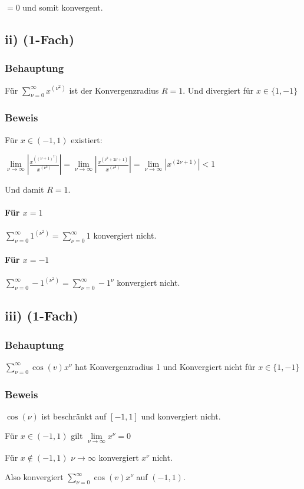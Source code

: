 $ = 0$ und somit konvergent.


\subsection*{ii) (1-Fach)}

\subsubsection*{Behauptung}

Für $\sum\limits^{\infty}_{\nu = 0}x^{(\nu^{2})}$ ist der Konvergenzradius $R = 1$.
Und divergiert für $x \in \{1,-1\}$

\subsubsection*{Beweis}

Für $x \in (-1,1)$ existiert:

$\lim\limits_{\nu \to \infty}|\frac{x^{((\nu+1)^{2})}}{x^{(\nu^{2})}}|
= \lim\limits_{\nu \to \infty}|\frac{x^{(\nu^{2}+2\nu+1)}}{x^{(\nu^{2})}}|
= \lim\limits_{\nu \to \infty}|x^{(2\nu+1)}| < 1$

Und damit $R = 1$.

\paragraph*{Für $x = 1$}

$\sum\limits^{\infty}_{\nu = 0}1^{(\nu^{2})} = \sum\limits^{\infty}_{\nu = 0} 1$ konvergiert nicht.

\paragraph*{Für $x = -1$}

$\sum\limits^{\infty}_{\nu = 0}-1^{(\nu^{2})} = \sum\limits^{\infty}_{\nu = 0} -1^{\nu}$ konvergiert nicht.


\subsection*{iii) (1-Fach)}

\subsubsection*{Behauptung}

$\sum\limits^{\infty}_{\nu = 0}\cos(v)x^{\nu}$ hat Konvergenzradius 1 und Konvergiert nicht für $x \in \{1,-1\}$

\subsubsection*{Beweis}

$\cos(\nu)$ ist beschränkt auf $[-1,1]$ und konvergiert nicht.

Für $x \in (-1,1)$  gilt $\lim\limits_{\nu \to \infty} x^{\nu} = 0$

Für $x \notin (-1,1)$ $\nu \to \infty $ konvergiert $x^{\nu}$ nicht.

Also konvergiert $\sum\limits^{\infty}_{\nu = 0}\cos(v)x^{\nu}$ auf $(-1,1)$.
